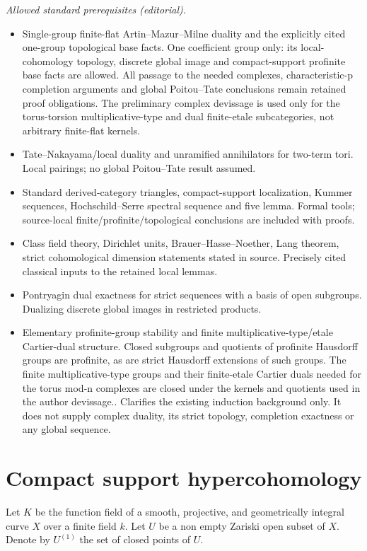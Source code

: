\documentclass[10pt,a4paper]{amsart}
\theoremstyle{plain}
\theoremstyle{definition}
\begin{document}
\noindent\textit{Allowed standard prerequisites (editorial).}\begin{itemize}
\item Single-group finite-flat Artin–Mazur–Milne duality and the explicitly cited one-group topological base facts. One coefficient group only: its local-cohomology topology, discrete global image and compact-support profinite base facts are allowed. All passage to the needed complexes, characteristic-p completion arguments and global Poitou–Tate conclusions remain retained proof obligations. The preliminary complex devissage is used only for the torus-torsion multiplicative-type and dual finite-etale subcategories, not arbitrary finite-flat kernels.
\item Tate–Nakayama/local duality and unramified annihilators for two-term tori. Local pairings; no global Poitou–Tate result assumed.
\item Standard derived-category triangles, compact-support localization, Kummer sequences, Hochschild–Serre spectral sequence and five lemma. Formal tools; source-local finite/profinite/topological conclusions are included with proofs.
\item Class field theory, Dirichlet units, Brauer–Hasse–Noether, Lang theorem, strict cohomological dimension statements stated in source. Precisely cited classical inputs to the retained local lemmas.
\item Pontryagin dual exactness for strict sequences with a basis of open subgroups. Dualizing discrete global images in restricted products.
\item Elementary profinite-group stability and finite multiplicative-type/etale Cartier-dual structure. Closed subgroups and quotients of profinite Hausdorff groups are profinite, as are strict Hausdorff extensions of such groups. The finite multiplicative-type groups and their finite-etale Cartier duals needed for the torus mod-n complexes are closed under the kernels and quotients used in the author devissage.. Clarifies the existing induction background only. It does not supply complex duality, its strict topology, completion exactness or any global sequence.
\end{itemize}\medskip
\section{Compact support hypercohomology} \label{one}

Let $K$ be the function field of a smooth, projective, and geometrically
integral curve $X$ over a finite field $k$. Let $U$ be a non empty
Zariski open subset of $X$. Denote by $U^{(1)}$ the set of closed points
of $U$.
\end{document}
